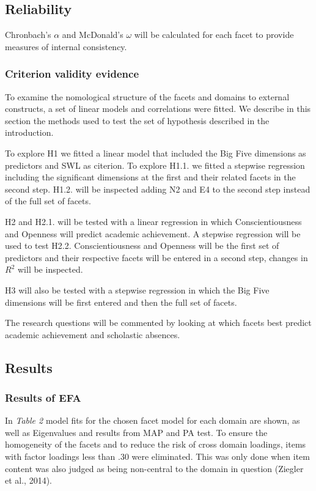 \documentclass[,man,floatsintext]{apa6}
\begin{document}
\subsection{Reliability}\label{reliability}

Chronbach's \(\alpha\) and McDonald's \(\omega\) will be calculated for
each facet to provide measures of internal consistency.

\subsubsection{Criterion validity
evidence}\label{criterion-validity-evidence}

To examine the nomological structure of the facets and domains to
external constructs, a set of linear models and correlations were
fitted. We describe in this section the methods used to test the set of
hypothesis described in the introduction.

To explore H1 we fitted a linear model that included the Big Five
dimensions as predictors and SWL as citerion. To explore H1.1. we fitted
a stepwise regression including the significant dimensions at the first
and their related facets in the second step. H1.2. will be inspected
adding N2 and E4 to the second step instead of the full set of facets.

H2 and H2.1. will be tested with a linear regression in which
Conscientiousness and Openness will predict academic achievement. A
stepwise regression will be used to test H2.2. Conscientiousness and
Openness will be the first set of predictors and their respective facets
will be entered in a second step, changes in \(R^2\) will be inspected.

H3 will also be tested with a stepwise regression in which the Big Five
dimensions will be first entered and then the full set of facets.

The research questions will be commented by looking at which facets best
predict academic achievement and scholastic absences.

\subsection{Results}\label{results}

\subsubsection{Results of EFA}\label{results-of-efa}

In \emph{Table 2} model fits for the chosen facet model for each domain
are shown, as well as Eigenvalues and results from MAP and PA test. To
ensure the homogeneity of the facets and to reduce the risk of cross
domain loadings, items with factor loadings less than .30 were
eliminated. This was only done when item content was also judged as
being non-central to the domain in question (Ziegler et al., 2014).
\end{document}
